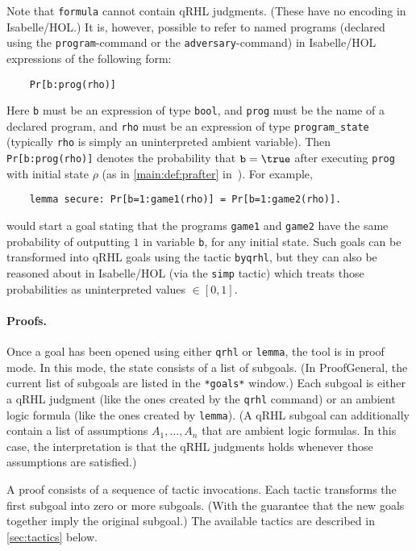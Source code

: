 \documentclass{article}
\newcommand\qrhlautoref[1]{\autoref*{main:#1} in~\cite{qrhl-paper-from-manual}}
\begin{document}
Note that \texttt{formula} cannot contain qRHL judgments. (These have
no encoding in Isabelle/HOL.) It is, however, possible to refer to
named programs (declared using the \texttt{program}-command or the
\texttt{adversary}-command) in Isabelle/HOL expressions of the
following form:
\begin{center}
  \begin{lstlisting}
    Pr[b:prog(rho)]
  \end{lstlisting}
\end{center}
Here \texttt{b} must be an expression of type \texttt{bool},
and \texttt{prog} must be the name of a
declared program, and \texttt{rho} must be an expression of type
\texttt{program\_state} (typically \texttt{rho} is simply an
uninterpreted ambient variable).  Then \texttt{Pr[b:prog(rho)]} 
denotes the probability that $\mathtt{b}=\true$
after executing \texttt{prog} with initial state $\rho$
(as in \qrhlautoref{def:prafter}).  For example,
\begin{center}
  \begin{lstlisting}
    lemma secure: Pr[b=1:game1(rho)] = Pr[b=1:game2(rho)].
  \end{lstlisting}
\end{center}
would start a goal stating that the programs \texttt{game1} and
\texttt{game2} have the same probability of outputting $1$
in variable \texttt{b}, for any initial state. Such goals can be
transformed into qRHL goals using the tactic \texttt{byqrhl}, but they
can also be reasoned about in Isabelle/HOL (via the \texttt{simp}
tactic) which treats those probabilities as uninterpreted values $\in[0,1]$.


\paragraph{Proofs.} Once a goal has been opened using either
\texttt{qrhl} or \texttt{lemma}, the tool is in proof mode. In this
mode, the state consists of a list of subgoals. (In ProofGeneral, the
current list of subgoals are listed in the \texttt{*goals*} window.)
Each subgoal is either a qRHL judgment (like the ones created by the
\texttt{qrhl} command) or an ambient logic formula (like the ones
created by \texttt{lemma}). (A qRHL subgoal can additionally contain a
list of assumptions $A_1,\dots,A_n$
that are ambient logic formulas. In this case, the interpretation is
that the qRHL judgments holds whenever those assumptions are satisfied.)

A proof consists of a sequence of tactic invocations. Each tactic
transforms the first subgoal into zero or more subgoals.  (With the
guarantee that the new goals together imply the original subgoal.)
The available tactics are described in \autoref{sec:tactics} below.
\end{document}
